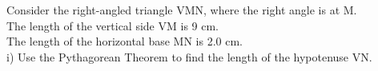\documentclass[preview]{standalone}
\begin{document}
\begin{center}
\begin{minipage}{12cm}
\raggedright Consider the right-angled triangle VMN, where the right angle is at M. \\
 The length of the vertical side VM is 9 cm. \\
 The length of the horizontal base MN is 2.0 cm. \\
 i) Use the Pythagorean Theorem to find the length of the hypotenuse VN.
\end{minipage}
\end{center}
\end{document}
